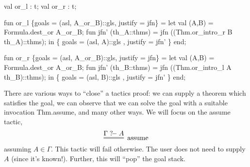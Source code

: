 \nwenddocs{}\plusendmoddef\nwstartdeflinemarkup{}\nwenddeflinemarkup
val or_l : t;
val or_r : t;
\nwendcode{}\nwdocspar

\nwenddocs{}\plusendmoddef\nwstartdeflinemarkup{}\nwenddeflinemarkup
fun or_l \{goals = (asl, A_or_B)::gls, justify = jfn\} =
  let
    val (A,B) = Formula.dest_or A_or_B;
    fun jfn' (th_A::thms) =
      jfn ((Thm.or_intro_r B th_A)::thms);
  in
    \{ goals = (asl, A)::gls
    , justify = jfn' \}
  end;

fun or_r \{goals = (asl, A_or_B)::gls, justify = jfn\} =
  let
    val (A,B) = Formula.dest_or A_or_B;
    fun jfn' (th_B::thms) =
      jfn ((Thm.or_intro_l A th_B)::thms);
  in
    \{ goals = (asl, B)::gls
    , justify = jfn' \}
  end;
\eatline
{}\nwendcode{}\nwdocspar
\begin{node}
There are various ways to ``close'' a tactics proof: we can supply a
theorem which satisfies the goal, we can observe that we can solve the
goal with a suitable invocation {\Tt{}Thm.assume\nwendquote}, and many other
ways. We will focus on the {\Tt{}assume\nwendquote} tactic,
\begin{equation*}
\vcenter{\infer=[\mbox{assume}]{}{\Gamma\gdash A}}
\end{equation*}
assuming $A\in\Gamma$. This tactic will fail otherwise. The user does
not need to supply $A$ (since it's known!). Further, this will ``pop''
the goal stack.
\end{node}

